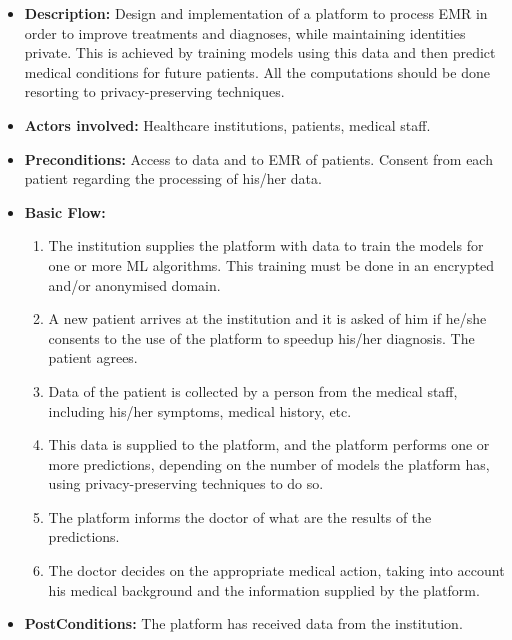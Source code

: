 \begin{itemize}
	\setlength\itemsep{1em}

	\item \textbf{Description:} Design and implementation of a platform to process \ac{EMR} in order to improve treatments and diagnoses, while maintaining identities private. This is achieved by training models using this data and then predict medical conditions for future patients. All the computations should be done resorting to privacy-preserving techniques.

	\item \textbf{Actors involved:} Healthcare institutions, patients, medical staff.

	\item \textbf{Preconditions:} Access to data and to \ac{EMR} of patients. Consent from each patient regarding the processing of his/her data.

	\item \textbf{Basic Flow:} 
	
	\begin{enumerate}
		\item The institution supplies the platform with data to train the models for one or more \ac{ML} algorithms. This training must be done in an encrypted and/or anonymised domain.

		\item A new patient arrives at the institution and it is asked of him if he/she consents to the use of the platform to speedup his/her diagnosis. The patient agrees.

		\item Data of the patient is collected by a person from the medical staff, including his/her symptoms, medical history, etc.

		\item This data is supplied to the platform, and the platform performs one or more predictions, depending on the number of models the platform has, using privacy-preserving techniques to do so.

		\item The platform informs the doctor of what are the results of the predictions.

		\item The doctor decides on the appropriate medical action, taking into account his medical background and the information supplied by the platform.


	\end{enumerate}

	\item \textbf{PostConditions:} The platform has received data from the institution. 

\end{itemize}





